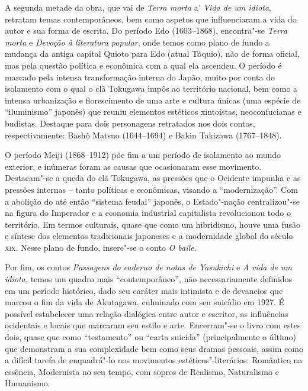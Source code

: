 \documentclass[12pt]{extarticle}
\begin{document}


A segunda metade da obra, que vai de \emph{Terra morta} a' \emph{Vida de um
idiota}, retratam temas contemporâneos, bem como aspetos que influenciaram a
vida do autor e sua forma de escrita. Do período Edo (1603--1868), encontra"-se
\emph{Terra morta} e \emph{Devoção à literatura popular}, onde temos como plano
de fundo a mudança da antiga capital Quioto para Edo (atual Tóquio), não de
forma oficial, mas pela questão política e econômica com a qual ela ascendeu. O
período é marcado pela intensa transformação interna do Japão, muito por conta
do isolamento com o qual o clã Tokugawa impôs ao território nacional, bem como
a intensa urbanização e florescimento de uma arte e cultura únicas (uma espécie
de ``iluminismo'' japonês) que reuniu elementos estéticos xintoístas,
neoconfucianas e budistas. Destaque para dois personagens retratados nos dois
contos, respectivamente: Bashô Matsuo (1644--1694) e Bakin Takizawa (1767--1848).

O período Meiji (1868--1912) põe fim a um período de isolamento ao mundo
exterior, e inúmeras foram as causas que ocasionaram esse movimento.
Destacam"-se a queda do clã Tokugawa, as pressões que o Ocidente impunha e as
pressões internas -- tanto políticas e econômicas, visando a ``modernização''.
Com a abolição do até então ``sistema feudal'' japonês, o Estado"-nação
centralizou"-se na figura do Imperador e a economia industrial capitalista
revolucionou todo o território. Em termos culturais, quase que como um
hibridismo, houve uma fusão e síntese dos elementos tradicionais japoneses e a
modernidade global do século \textsc{xix}. Nesse plano de fundo, insere"-se o
conto \emph{O baile}.

Por fim, os contos \emph{Passagens do caderno de notas de Yasukichi} e \emph{A
vida de um idiota,} temos um quadro mais ``contemporâneo'', não necessariamente
definidos em um período histórico, dado seu caráter mais intimista e de
devaneios que marcou o fim da vida de Akutagawa, culminado com seu suicídio em
1927. É possível estabelecer uma relação dialógica entre autor e escritor, as
influências ocidentais e locais que marcaram seu estilo e arte. Encerram"-se o
livro com estes dois, quase que como ``testamento'' ou ``carta suicida''
(principalmente o último) que demonstram a sua complexidade bem como seus
dramas pessoais, assim como a difícil tarefa de enquadrá"-lo nos movimentos
estéticos"-literários: Romântico na essência, Modernista no seu tempo, com
sopros de Realismo, Naturalismo e Humanismo.
\end{document}
